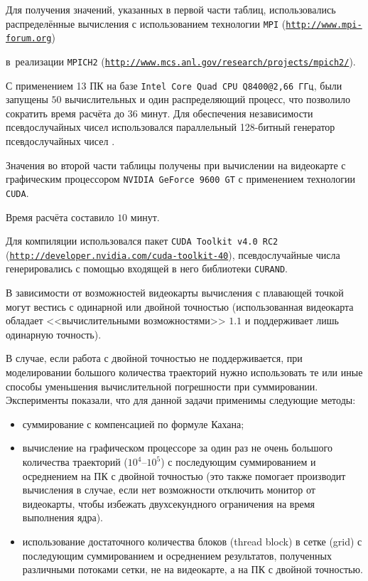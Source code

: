    Для получения значений, указанных в первой части таблиц, использовались распределённые вычисления с использованием технологии {\tt MPI} (\href{http://www.mpi-forum.org}{\tt\footnotesize http://www.mpi-forum.org}) 

   в~реа\-ли\-зации {\tt MPICH2} (\href{http://www.mcs.anl.gov/research/projects/mpich2/}{\tt\footnotesize http://www.mcs.anl.gov/research/projects/mpich2/}).  

С применением 13 ПК на базе {\tt Intel\textregistered{} Core Quad CPU Q8400@2,66\,ГГц}, были запущены $50$ вычислительных и один распределяющий процесс, что позволило сократить время расчёта до $36$ минут. Для обеспечения независимости псевдослучайных чисел использовался параллельный 128-битный генератор псевдослучайных чисел \cite{kuzn:MikMar}.

    Значения во второй части таблицы получены при вычислении на видеокарте с графическим процессором {\tt NVIDIA\textregistered{} GeForce\textregistered{} 9600 GT} с применением технологии {\tt CUDA}. 

Время расчёта составило $10$ минут. 

Для компиляции использовался пакет {\tt CUDA Toolkit v4.0 RC2} (\href{http://developer.nvidia.com/cuda-toolkit-40/}{\tt \footnotesize http://developer.nvidia.com/cuda-toolkit-40}), псевдослучайные числа генерировались с помощью входящей в него библиотеки {\tt CURAND}. 

В зависимости от возможностей видеокарты вычисления с плавающей точкой могут вестись с одинарной или двойной точностью (использованная видеокарта обладает <<вычислительными возможностями>> $1.1$ и поддерживает лишь одинарную точность). 

В случае, если работа с двойной точностью не поддерживается, при моделировании большого количества траекторий нужно использовать те или иные способы уменьшения вычислительной погрешности при суммировании. Эксперименты показали, что для данной задачи применимы следующие методы:

    \begin{itemize}

        \item суммирование с компенсацией по формуле Кахана\cite{kuzn:Kahan};

        \item вычисление на графическом процессоре за один раз не очень большого количества траекторий ($10^4$--$10^5$) с последующим суммированием и осреднением на ПК с двойной точностью (это также помогает производит вычисления в случае, если нет возможности отключить монитор от видеокарты, чтобы избежать двухсекундного ограничения на время выполнения ядра).

        \item использование достаточного количества блоков (thread block) в сетке (grid) с последующим суммированием и осреднением результатов, полученных различными потоками сетки, не на видеокарте, а на ПК с двойной точностью.

    \end{itemize}



